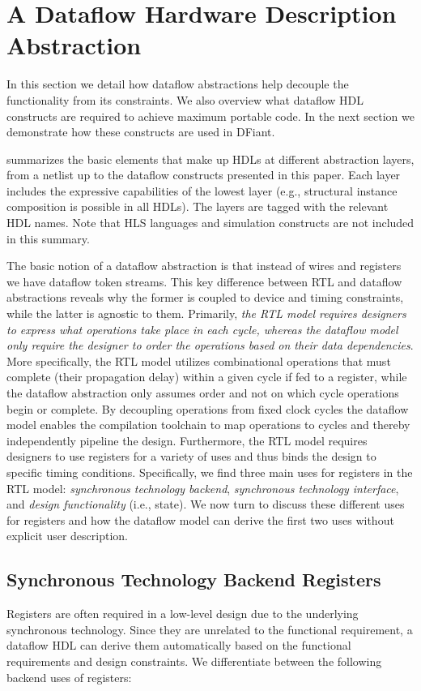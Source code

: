 \section{A Dataflow Hardware Description Abstraction}
\label{sec:motivation}
In this section we detail how dataflow abstractions help decouple the functionality from its constraints. We also overview what dataflow HDL constructs are required to achieve maximum portable code. In the next section we demonstrate how these constructs are used in DFiant.

 summarizes the basic elements that make up HDLs at different abstraction layers, from a netlist up to the dataflow constructs presented in this paper. Each layer includes the expressive capabilities of the lowest layer (e.g., structural instance composition is possible in all HDLs). The layers are tagged with the relevant HDL names. Note that HLS languages and simulation constructs are not included in this summary. 

The basic notion of a dataflow abstraction is that instead of wires and registers we have dataflow token streams. This key difference between RTL and dataflow abstractions reveals why the former is coupled to device and timing constraints, while the latter is agnostic to them. Primarily, \emph{the RTL model requires designers to express what operations take place in each cycle, whereas the dataflow model only require the designer to order the operations based on their data dependencies}. More specifically, the RTL model utilizes combinational operations that must complete (their propagation delay) within a given cycle if fed to a register, while the dataflow abstraction only assumes order and not on which cycle operations begin or complete. By decoupling operations from fixed clock cycles the dataflow model enables the compilation toolchain to map operations to cycles and thereby independently pipeline the design. Furthermore, the RTL model requires designers to use registers for a variety of uses and thus binds the design to specific timing conditions. Specifically, we find three main uses for registers in the RTL model: \emph{synchronous technology backend}, \emph{synchronous technology interface}, and \emph{design functionality} (i.e., state). We now turn to discuss these different uses for registers and how the dataflow model can derive the first two uses without explicit user description.

\subsection{Synchronous Technology Backend Registers}
Registers are often required in a low-level design due to the underlying synchronous technology. Since they are unrelated to the functional requirement, a dataflow HDL can derive them automatically based on the functional requirements and design constraints. 
We differentiate between the following backend uses of registers:
